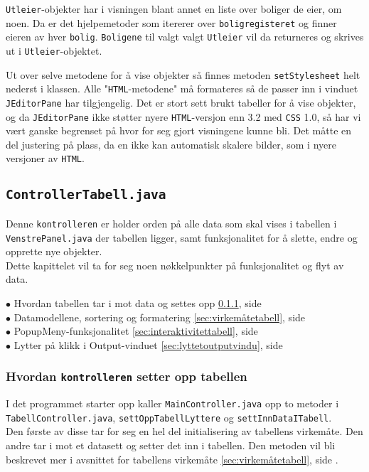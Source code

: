 \texttt{Utleier}-objekter har i visningen blant annet en liste over boliger de eier, om noen. Da er det hjelpemetoder som itererer over \texttt{boligregisteret} og finner eieren av hver \texttt{bolig}. \texttt{Boligene} til valgt valgt \texttt{Utleier} vil da returneres og skrives ut i \texttt{Utleier}-objektet.

Ut over selve metodene for å vise objekter så finnes metoden \texttt{setStylesheet} helt nederst i klassen.
Alle "\texttt{HTML}-metodene" må formateres så de passer inn i vinduet \texttt{JEditorPane} har tilgjengelig. 
Det er stort sett brukt tabeller for å vise objekter, og da \texttt{JEditorPane} ikke støtter nyere \texttt{HTML}-versjon enn 3.2 med \texttt{CSS} 1.0, så har vi vært ganske begrenset på hvor for seg gjort visningene kunne bli.
Det måtte en del justering på plass, da en ikke kan automatisk skalere bilder, som i nyere versjoner av \texttt{HTML}.


\subsection{\texttt{ControllerTabell.java}}
Denne \texttt{kontrolleren} er holder orden på alle data som skal vises i tabellen i \texttt{VenstrePanel.java} der tabellen ligger, samt funksjonalitet for å slette, endre og opprette nye objekter. \\
Dette kapittelet vil ta for seg noen nøkkelpunkter på funksjonalitet og flyt av data.

$\bullet$ Hvordan tabellen tar i mot data og settes opp \ref{sec:oppsettabell}, side \pageref{sec:oppsettabell} \\ 
$\bullet$ Datamodellene, sortering og formatering \ref{sec:virkemåtetabell}, side \pageref{sec:virkemåtetabell} \\
$\bullet$ PopupMeny-funksjonalitet \ref{sec:interaktivitettabell}, side \pageref{sec:interaktivitettabell} \\
$\bullet$ Lytter på klikk i Output-vinduet \ref{sec:lyttetoutputvindu}, side \pageref{sec:lyttetoutputvindu} \\


\subsubsection{Hvordan \texttt{kontrolleren} setter opp tabellen} \label{sec:oppsettabell}
I det programmet starter opp kaller \texttt{MainController.java} opp to metoder i \texttt{TabellController.java}, \texttt{settOppTabellLyttere} og \texttt{settInnDataITabell}. \\
Den første av disse tar for seg en hel del initialisering av tabellens virkemåte. Den andre tar i mot et datasett og setter det inn i tabellen. Den metoden vil bli beskrevet mer i avsnittet for tabellens virkemåte \ref{sec:virkemåtetabell}, side \pageref{sec:virkemåtetabell}. \\

